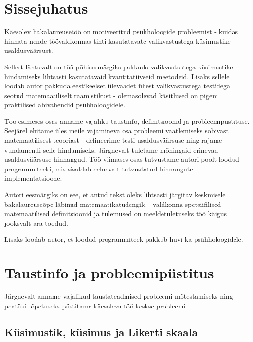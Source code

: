 \documentclass[a4paper,12pt,oneside]{article}
\numberwithin{equation}{section}
\theoremstyle{definition}
\begin{document}
\pagebreak


\tableofcontents

\pagebreak

\section{Sissejuhatus}

Käesolev bakalaureusetöö on motiveeritud psühholoogide probleemist - kuidas hinnata nende töövaldkonnas tihti kasutatavate valikvastustega küsimustike usaldusväärsust. 

Sellest lähtuvalt on töö põhieesmärgiks pakkuda valikvastustega küsimustike hindamiseks lihtsasti kasutatavaid kvantitatiivseid meetodeid. Lisaks sellele loodab autor pakkuda eestikeelset ülevaadet ühest valikvastustega testidega seotud matemaatiliselt raamistikust - olemasolevad käsitlused on pigem praktilised abivahendid psühholoogidele. 

Töö esimeses osas anname vajaliku taustinfo, definitsioonid ja probleemipüstituse. Seejärel ehitame üles meile vajamineva osa probleemi vaatlemiseks sobivast matemaatilisest teooriast - defineerime testi usaldusväärsuse ning rajame vundamendi selle hindamiseks. Järgnevalt tuletame mõningaid erinevad usaldusväärsuse hinnangud. Töö viimases osas tutvustame autori poolt loodud programmiteeki, mis sisaldab eelnevalt tutvustatud hinnangute implementatsioone.

Autori eesmärgiks on see, et antud tekst oleks lihtsasti järgitav keskmisele bakalaureuseõpe läbinud matemaatikatudengile - valdkonna spetsiifilised matemaatilised definitsioonid ja tulemused on meeldetuletuseks töö käigus jooksvalt ära toodud. 

Lisaks loodab autor, et loodud programmiteek pakkub huvi ka psühholoogidele. 






\pagebreak



\section{Taustinfo ja probleemipüstitus}

Järgnevalt anname vajalikud taustateadmised probleemi mõtestamiseks ning peatüki lõpetuseks püstitame käesoleva töö keskse probleemi.

\subsection{Küsimustik, küsimus ja Likerti skaala}
\end{document}

